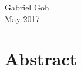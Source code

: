 
{\singlespacing
   \begin{flushright}
      Gabriel Goh \\
      May 2017 \\
   \end{flushright}
}

\bigskip

\section*{Abstract}
